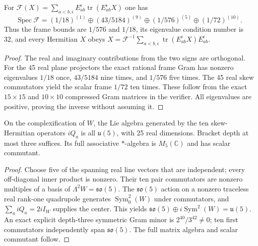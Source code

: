 \documentclass[11pt]{article}
\begin{document}
\begin{corollary}
\label{p1b:cor:v17-petersen-ic-frame}
For $\mathcal F(X)=\sum_{a<b,\epsilon}E_{ab}^{\epsilon}
\operatorname{tr}(E_{ab}^{\epsilon}X)$ one has
\[
 \boxed{\operatorname{Spec}\mathcal F
 =(1/18)^{(1)}\oplus(43/5184)^{(9)}
 \oplus(1/576)^{(5)}\oplus(1/72)^{(10)}}.
\]
Thus the frame bounds are $1/576$ and $1/18$, its eigenvalue
condition number is 32, and every Hermitian $X$ obeys
$X=\mathcal F^{-1}\sum_{a<b,\epsilon}
\operatorname{tr}(E_{ab}^{\epsilon}X)E_{ab}^{\epsilon}$.
\end{corollary}
\begin{proof}
The real and imaginary contributions from the two signs are orthogonal.
For the 45 real plane projectors the exact rational frame Gram has
nonzero eigenvalues $1/18$ once, $43/5184$ nine times, and $1/576$
five times. The 45 real skew commutators yield the scalar frame
$1/72$ ten times. These follow from the exact $15\times15$ and
$10\times10$ compressed Gram matrices in the verifier. All eigenvalues
are positive, proving the inverse without assuming it.
\end{proof}

\begin{theorem}
\label{p1b:thm:v17-petersen-u5-generation}
On the complexification of $W$, the Lie algebra generated by the ten
skew-Hermitian operators $iQ_a$ is all $\mathfrak u(5)$, with 25 real
dimensions. Bracket depth at most three suffices. Its full associative
$\ast$-algebra is $M_5(\mathbb C)$ and has scalar commutant.
\end{theorem}
\begin{proof}
Choose five of the spanning real line vectors that are independent;
every off-diagonal inner product is nonzero. Their ten pair commutators
are nonzero multiples of a basis of $\Lambda^2W=\mathfrak{so}(5)$.
The $\mathfrak{so}(5)$ action on a nonzero traceless real rank-one
quadrupole generates $\operatorname{Sym}^2_0(W)$ under commutators,
and $\sum_a iQ_a=2iI_W$ supplies the center. This yields
$\mathfrak{so}(5)\oplus i\operatorname{Sym}^2(W)=\mathfrak u(5)$.
An exact explicit depth-three symmetric Gram minor is
$2^{40}/3^{42}\ne0$; ten first commutators independently span
$\mathfrak{so}(5)$. The full matrix algebra and scalar commutant follow.
\end{proof}
\end{document}
